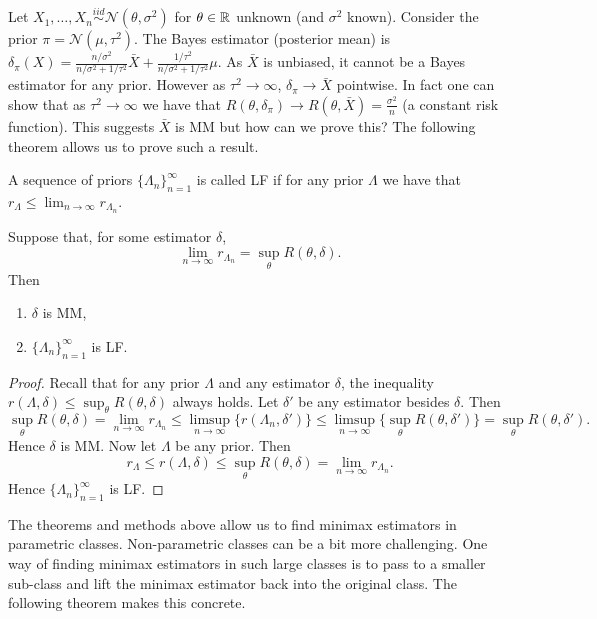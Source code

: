 \begin{example}
	Let $X_1, \dots, X_n \overset{iid}{\sim} \mathcal{N}(\theta, \sigma^2)$ for $\theta \in \mathbb{R}$ unknown (and $\sigma^2$ known). Consider the prior $\pi = \mathcal{N}(\mu, \tau^2)$. The Bayes estimator (posterior mean) is $\delta_\pi(X) =  \frac{n/\sigma^2}{n/\sigma^2 + 1/\tau^2} \bar{X} + \frac{1/\tau^2}{n/\sigma^2 + 1/\tau^2} \mu$. As $\bar{X}$ is unbiased, it cannot be a Bayes estimator for any prior. However as $\tau^2 \to \infty$, $\delta_\pi \to \bar{X}$ pointwise. In fact one can show that as $\tau^2 \to \infty$ we have that $R(\theta, \delta_\pi) \to R(\theta, \bar{X}) = \frac{\sigma^2}{n}$ (a constant risk function). This suggests $\bar{X}$ is MM but how can we prove this? The following theorem allows us to prove such a result.
\end{example}

\begin{definition}
A sequence of priors $\{\Lambda_n\}_{n = 1}^{\infty}$ is called LF if for any prior $\Lambda$ we have that $r_\Lambda \leq \lim_{n\to\infty} r_{\Lambda_n}$.
\end{definition}

\begin{theorem}
	Suppose that, for some estimator $\delta$,
	\[
	\lim_{n\to\infty} r_{\Lambda_n}
	=
	\sup_\theta R(\theta, \delta).
	\]
	Then
	\begin{enumerate}
		\item[(i)] $\delta$ is MM,
		\item[(ii)] $\{\Lambda_n\}_{n = 1}^{\infty}$ is LF.
	\end{enumerate}
\end{theorem}

\begin{proof}
	Recall that for any prior $\Lambda$ and any estimator $\delta$, the inequality $r(\Lambda, \delta) \leq \sup_\theta R(\theta, \delta)$ always holds. Let $\delta'$ be any estimator besides $\delta$. Then \[
		\sup_\theta R(\theta, \delta) = \lim_{n\to\infty} r_{\Lambda_n} \leq \limsup_{n\to\infty} \{r(\Lambda_n, \delta')\} \leq \limsup_{n\to\infty} \{\sup_\theta R(\theta, \delta')\} = \sup_\theta R(\theta, \delta').
	\] Hence $\delta$ is MM. Now let $\Lambda$ be any prior. Then \[
		r_\Lambda \leq r(\Lambda, \delta) \leq \sup_\theta R(\theta, \delta) = \lim_{n\to\infty} r_{\Lambda_n}.
	\] Hence $\{\Lambda_n\}_{n = 1}^{\infty}$ is LF.
\end{proof}

\noindent The theorems and methods above allow us to find minimax estimators in parametric classes. Non-parametric classes can be a bit more challenging. One way of finding minimax estimators in such large classes is to pass to a smaller sub-class and lift the minimax estimator back into the original class. The following theorem makes this concrete.

